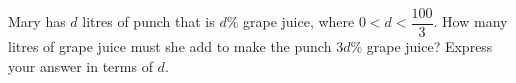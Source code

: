 Mary has $d$ litres of punch that is $d\%$ grape juice, where $0<d<\dfrac{100}{3}$. How many litres of grape juice must she add to make the punch $3d\%$ grape juice? Express your answer in terms of $d$.
